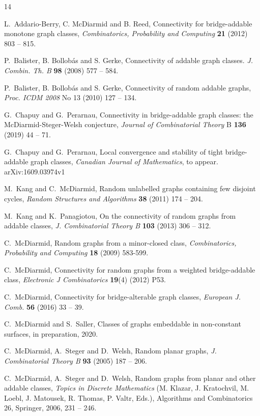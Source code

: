 \documentclass[12pt]{article}
\newcommand{\m}[1]{\marginpar{\tiny{#1}}}
\begin{document}
\begin{thebibliography}{14}

L.~Addario-Berry, C. McDiarmid and B. Reed,
Connectivity for bridge-addable monotone graph classes,
{\em Combinatorics, Probability and Computing} {\bf 21} (2012) 803 -- 815.


P.~Balister, B. Bollob{\'a}s and S. Gerke,
{Connectivity of addable graph classes}. {\em J. Combin. Th. B} {\bf 98} (2008) 577 -- 584.


P.~Balister, B. Bollob{\'a}s and S. Gerke,
Connectivity of random addable graphs, {\em Proc. ICDM 2008} No 13 (2010) 127 -- 134.

  
G.~Chapuy and G.~Perarnau,
Connectivity in bridge-addable graph classes: the McDiarmid-Steger-Welsh conjecture,
{\em Journal of Combinatorial Theory} B {\bf 136} (2019) 44 -- 71.

G.~Chapuy and G.~Perarnau,
Local convergence and stability of tight bridge-addable graph classes,
{\em Canadian Journal of Mathematics}, to appear. arXiv:1609.03974v1

M.~Kang and C.~McDiarmid,
Random unlabelled graphs containing few disjoint cycles,
{\em Random Structures and Algorithms} {\bf 38} (2011) 174 -- 204.


M.~Kang and K.~Panagiotou,
On the connectivity of random graphs from addable classes,
{\em J. Combinatorial Theory B} {\bf 103} (2013) 306 -- 312.


C.~McDiarmid, Random graphs from a minor-closed class,
 {\em Combinatorics, Probability and Computing} {\bf 18} (2009) 583-599.


C.~McDiarmid,
Connectivity for random graphs from a weighted bridge-addable class,
{\em Electronic J Combinatorics} {\bf 19}(4) (2012) P53.


C.~McDiarmid,
Connectivity for bridge-alterable graph classes,
{\em European J. Comb.} {\bf 56} (2016) 33 -- 39.


C.~McDiarmid and S.~Saller,
Classes of graphs embeddable in non-constant surfaces,
in preparation, 2020.


C.~McDiarmid, A.~Steger and D.~Welsh,
Random planar graphs,
{\em J. Combinatorial Theory B} {\bf 93} (2005) 187 -- 206.


C.~McDiarmid, A.~Steger and D.~Welsh,
Random graphs from planar and other addable classes,
{\em Topics in Discrete Mathematics} (M. Klazar, J. Kratochvil, M. Loebl, J. Matousek, R. Thomas, P. Valtr, Eds.), Algorithms and Combinatorics 26, Springer, 2006, 231 -- 246.
  

\end{thebibliography}
\end{document}
